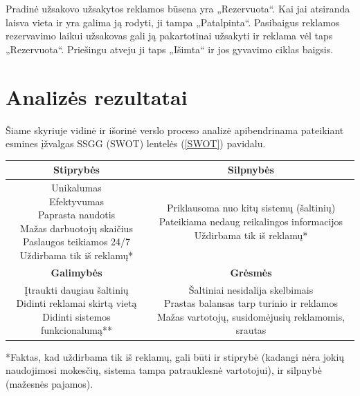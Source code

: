 \documentclass[12pt]{article}
\begin{document}
	Pradinė užsakovo užsakytos reklamos būsena yra „Rezervuota“. Kai jai atsiranda laisva vieta ir yra galima ją rodyti, ji tampa „Patalpinta“. Pasibaigus reklamos rezervavimo laikui užsakovas gali ją pakartotinai užsakyti ir reklama vėl taps „Rezervuota“. Priešingu atveju ji taps „Išimta“ ir jos gyvavimo ciklas baigsis.
	\pagebreak	
	
	\section{Analizės rezultatai}
	
	Šiame skyriuje vidinė ir išorinė verslo proceso analizė apibendrinama pateikiant esmines įžvalgas SSGG (SWOT) lentelės (\ref{SWOT}) pavidalu.
	
	\begin{center}
		\begin{tabular}{ | c | c | }
			\hline
			\textbf{Stiprybės} & \textbf{Silpnybės} \\ \hline 
			\makecell{Unikalumas \\ Efektyvumas \\ Paprasta naudotis \\ Mažas darbuotojų skaičius \\ Paslaugos teikiamos 24/7 \\ Uždirbama tik iš reklamų*} & \makecell{Priklausoma nuo kitų sistemų (šaltinių) \\ Pateikiama nedaug reikalingos informacijos \\ Uždirbama tik iš reklamų*} \\ \hline
			\textbf{Galimybės} & \textbf{Grėsmės} \\ \hline
			\makecell{Įtraukti daugiau šaltinių \\ Didinti reklamai skirtą vietą \\ Didinti sistemos funkcionalumą**} & \makecell{Šaltiniai nesidalija skelbimais \\ Prastas balansas tarp turinio ir reklamos \\ Mažas vartotojų, susidomėjusių reklamomis, srautas} \\ \hline 
		\end{tabular}
	\end{center}
	
	*Faktas, kad uždirbama tik iš reklamų, gali būti ir stiprybė (kadangi nėra jokių naudojimosi mokesčių, sistema tampa patrauklesnė vartotojui), ir silpnybė (mažesnės pajamos).
	
\end{document}
